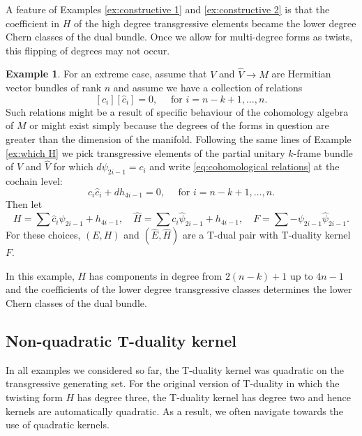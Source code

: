 \documentclass[12pt,twoside]{article}
\theoremstyle{plain}
\theoremstyle{definition}
\newtheorem{example}[theorem]{Example}
\numberwithin{equation}{section}
\begin{document}
A feature of Examples \ref{ex:constructive 1} and \ref{ex:constructive 2} is that the coefficient in $H$ of the high degree transgressive elements became the lower degree Chern classes of the dual bundle. Once we allow for multi-degree forms as twists, this flipping of degrees may not occur. 

\begin{example}For an extreme case, assume that $V$ and $\hat{V}\to M$ are Hermitian vector bundles of rank $n$ and assume we have a collection of relations
\begin{equation}\label{eq:cohomological relations}
[c_i][\hat{c}_i] = 0, \quad \mbox{ for } i = n-k+1,\dots, n.
\end{equation}
Such relations might be a result of specific behaviour of the cohomology algebra of $M$ or might exist simply because the degrees of the forms in question are greater than the dimension of the manifold. Following the same lines of Example \ref{ex:which H} we pick transgressive elements of the partial unitary $k$-frame bundle of $V$ and $\hat{V}$ for which $d\psi_{2i-1} = c_i$ and write \eqref{eq:cohomological relations} at the cochain level:
\begin{equation}
c_i \hat{c}_i + dh_{4i-1} =0,\quad \mbox{ for }  i = n-k+1,\dots, n.
\end{equation}
Then let
\[H = \sum\hat{c}_i\psi_{2i-1} + h_{4i-1}, \quad \hat{H} = \sum c_i\hat\psi_{2i-1} + h_{4i-1}, \quad F = \sum -\psi_{2i-1}\hat{\psi}_{2i-1}.\]
For these choices, $(E,H)$ and $(\hat{E},\hat{H})$ are a T-dual pair with T-duality kernel $F$.

In this example, $H$ has components in degree from $2(n-k)+1$ up to $4n-1$ and the coefficients of the lower degree transgressive classes determines the lower Chern classes of the dual bundle.
\end{example}


\subsection{Non-quadratic T-duality kernel}

In all examples we considered so far, the T-duality kernel was quadratic on the transgressive generating set. For the original version of T-duality \cite{BEM04} in which the  twisting form $H$ has degree three, the T-duality kernel  has degree two and hence kernels are automatically quadratic. As a result, we often navigate towards the use of quadratic kernels.
\end{document}
